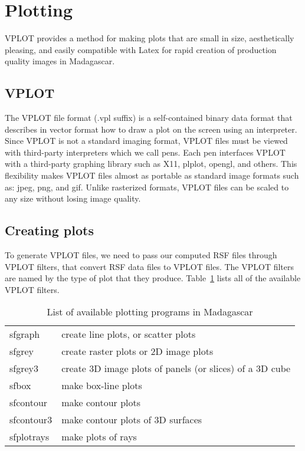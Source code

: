 \section{Plotting}

VPLOT provides a method for making plots that are small in size, aesthetically pleasing, and easily compatible with Latex for rapid creation of production quality images in Madagascar.

\subsection{VPLOT}
The VPLOT file format (.vpl suffix) is a self-contained binary data format that describes in vector format how to draw a plot on the screen using an interpreter. Since VPLOT is not a standard imaging format, VPLOT files must be viewed with third-party interpreters which we call pens. Each pen interfaces VPLOT with a third-party graphing library such as X11, plplot, opengl, and others. This flexibility makes VPLOT files almost as portable as standard image formats such as: jpeg, png, and gif. Unlike rasterized formats, VPLOT files can be scaled to any size without losing image quality.

\subsection{Creating plots}
To generate VPLOT files, we need to pass our computed RSF files through VPLOT filters, that convert RSF data files to VPLOT files. The VPLOT filters are named by the type of plot that they produce. Table~\ref{table:plotting} lists all of the available VPLOT filters.

\begin{table}

\begin{tabularx}{\textwidth}{|l|X| }
    \hline 
sfgraph & create line plots, or scatter plots \\
sfgrey & create raster plots or 2D image plots \\
sfgrey3 & create 3D image plots of panels (or slices) of a 3D cube \\
sfbox & make box-line plots \\
sfcontour & make contour plots \\
sfcontour3 & make contour plots of 3D surfaces \\
sfplotrays & make plots of rays \\
\hline 
\end{tabularx}
    \caption{List of available plotting programs in Madagascar}
    \label{table:plotting}
\end{table}

